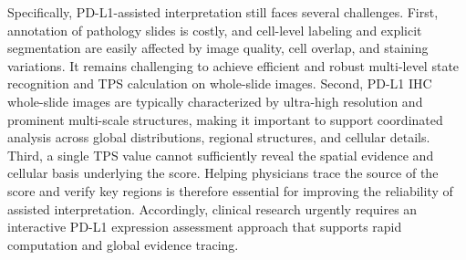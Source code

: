 \documentclass[journal]{vgtc}                     %
\begin{document}
Specifically, PD-L1-assisted interpretation still faces several challenges. First, annotation of pathology slides is costly, and cell-level labeling and explicit segmentation are easily affected by image quality, cell overlap, and staining variations. It remains challenging to achieve efficient and robust multi-level state recognition and TPS calculation on whole-slide images. Second, PD-L1 IHC whole-slide images are typically characterized by ultra-high resolution and prominent multi-scale structures, making it important to support coordinated analysis across global distributions, regional structures, and cellular details. Third, a single TPS value cannot sufficiently reveal the spatial evidence and cellular basis underlying the score. Helping physicians trace the source of the score and verify key regions is therefore essential for improving the reliability of assisted interpretation. Accordingly, clinical research urgently requires an interactive PD-L1 expression assessment approach that supports rapid computation and global evidence tracing.
\end{document}
